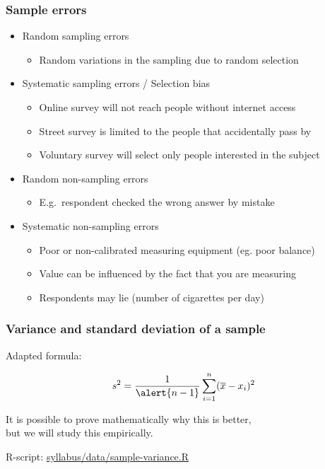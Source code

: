 \documentclass{beamer}
\begin{document}
\begin{frame}
  \frametitle{Sample errors}

  \begin{itemize}
    \item<+-> Random sampling errors
      \begin{itemize}
        \item Random variations in the sampling due to random selection
      \end{itemize}
    \item<+-> Systematic sampling errors / Selection bias
      \begin{itemize}
        \item Online survey will not reach people without internet access
        \item Street survey is limited to the people that accidentally pass by
        \item Voluntary survey will select only people interested in the subject
      \end{itemize}
    \item<+-> Random non-sampling errors
      \begin{itemize}
        \item E.g.~respondent checked the wrong answer by mistake
      \end{itemize}
    \item<+-> Systematic non-sampling errors
      \begin{itemize}
\item Poor or non-calibrated measuring equipment (eg. poor balance)
\item Value can be influenced by the fact that you are measuring
\item Respondents may lie (number of cigarettes per day)
      \end{itemize}
  \end{itemize}
\end{frame}

\begin{frame}
  \frametitle{Variance and standard deviation of a sample}

  \begin{center}
    Adapted formula:

    \begin{equation*}
    s^2 = \frac{1}{\alert{n-1}} \sum_{i=1}^{n} (\overline{x} - x_i)^2
    \end{equation*}

    It is possible to prove mathematically why this is better,\\
    but we will study this empirically.


    \vfill
    R-script: \href{https://github.com/HoGentTIN/research-techniques-course/blob/master/syllabus/data/sample-variance.R}{syllabus/data/sample-variance.R}
  \end{center}
\end{frame}
\end{document}
